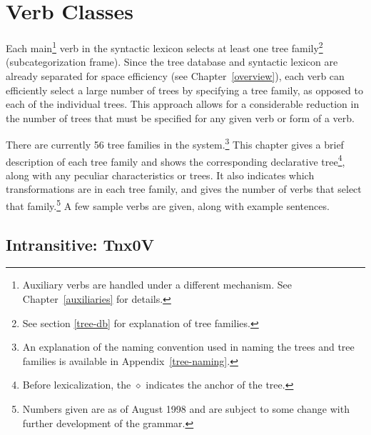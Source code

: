 
\chapter{Verb Classes}
\label{verb-classes}

Each main\footnote{Auxiliary verbs are handled under a different
mechanism.  See Chapter~\ref{auxiliaries} for details.} verb in the
syntactic lexicon selects at least one tree family\footnote{See
section \ref{tree-db} for explanation of tree families.}
(subcategorization frame).  Since the tree database and syntactic
lexicon are already separated for space efficiency (see
Chapter~\ref{overview}), each verb can efficiently select a large
number of trees by specifying a tree family, as opposed to each of the
individual trees.  This approach allows for a considerable reduction
in the number of trees that must be specified for any given verb or
form of a verb.

There are currently 56 tree families in the system.\footnote{An
  explanation of the naming convention used in naming the trees and
  tree families is available in Appendix~\ref{tree-naming}.}  This
chapter gives a brief description of each tree family and shows the
corresponding declarative tree\footnote{Before lexicalization, the
  $\diamond$ indicates the anchor of the tree.}, along with any
peculiar characteristics or trees.  It also indicates which
transformations are in each tree family, and gives the number of verbs
that select that family.\footnote{Numbers given are as of August 1998
  and are subject to some change with further development of the
  grammar.} A few sample verbs are given, along with example
sentences.


\section{Intransitive: Tnx0V}
\label{nx0V-family}

